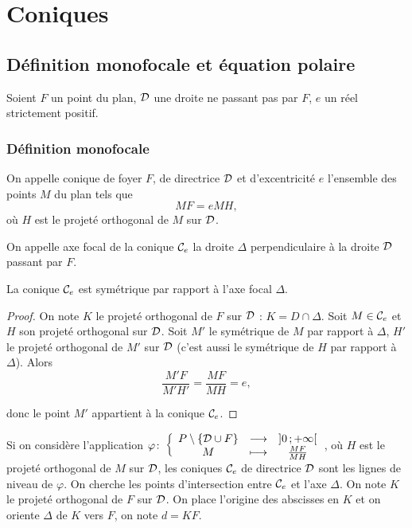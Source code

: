 \chapter{Coniques}
\minitoc
\minilof
\minilot
\section{Définition monofocale et équation polaire}
Soient \(F\) un point du plan, \(\mathcal{D}\) une droite ne passant pas par \(F\), \(e\) un réel strictement positif.
\subsection{Définition monofocale}
\begin{defdef}
   On appelle conique de foyer \(F\), de directrice \(\mathcal{D}\) et d'excentricité \(e\) l'ensemble des points \(M\) du plan tels que
  \begin{equation}
    MF=e MH,
  \end{equation}
  où \(H\) est le projeté orthogonal de \(M\) sur \(\mathcal{D}\).
\end{defdef}
\begin{defdef}
  On appelle axe focal de la conique \(\mathcal{C}_{e}\) la droite \(\Delta\) perpendiculaire à la droite \(\mathcal{D}\) passant par \(F\).
\end{defdef}
\begin{prop}
  La conique \(\mathcal{C}_{e}\) est symétrique par rapport à l'axe focal \(\Delta\).
\end{prop}
\begin{proof}
  On note \(K\) le projeté orthogonal de \(F\) sur \(\mathcal{D}\) : \(K=D \cap \Delta\). Soit \(M \in \mathcal{C}_{e}\) et \(H\) son projeté orthogonal sur \(\mathcal{D}\). Soit \(M'\) le symétrique de \(M\) par rapport à \(\Delta\), \(H'\) le projeté orthogonal de \(M'\) sur \(\mathcal{D}\) (c'est aussi le symétrique de \(H\) par rapport à \(\Delta\)). Alors
\begin{equation}
  \frac{M'F}{M'H'} = \frac{MF}{MH} = e,
\end{equation}

donc le point \(M'\) appartient à la conique \(\mathcal{C}_{e}\).
\end{proof}
Si on considère l'application \(\varphi\colon \left\{\begin{array}{ccc} P\setminus\{\mathcal{D} \cup F\} & \longrightarrow &\left] 0 \, ;  +\infty \right[\\ M & \longmapsto & \frac{MF}{MH} \end{array} \right.\), où \(H\) est le projeté orthogonal de \(M\) sur \(\mathcal{D}\), les coniques \(\mathcal{C}_{e}\) de directrice \(\mathcal{D}\) sont les lignes de niveau de \(\varphi\). On cherche les points d'intersection entre \(\mathcal{C}_{e}\) et l'axe \(\Delta\). On note \(K\) le projeté orthogonal de \(F\) sur \(\mathcal{D}\). On place l'origine des abscisses en \(K\) et on oriente \(\Delta\) de \(K\) vers \(F\), on note \(d=KF\).

